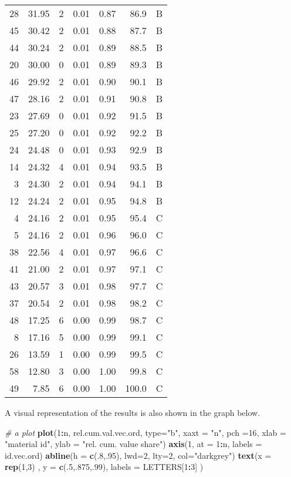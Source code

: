 \documentclass[
]{article}
\newenvironment{Shaded}{\begin{snugshade}}{\end{snugshade}}
\newcommand{\CommentTok}[1]{\textcolor[rgb]{0.56,0.35,0.01}{\textit{#1}}}
\newcommand{\DataTypeTok}[1]{\textcolor[rgb]{0.13,0.29,0.53}{#1}}
\newcommand{\DecValTok}[1]{\textcolor[rgb]{0.00,0.00,0.81}{#1}}
\newcommand{\KeywordTok}[1]{\textcolor[rgb]{0.13,0.29,0.53}{\textbf{#1}}}
\newcommand{\NormalTok}[1]{#1}
\newcommand{\OperatorTok}[1]{\textcolor[rgb]{0.81,0.36,0.00}{\textbf{#1}}}
\newcommand{\StringTok}[1]{\textcolor[rgb]{0.31,0.60,0.02}{#1}}
\begin{document}
\begin{longtable}[]{@{}rrrrrrl@{}}
28 & 31.95 & 2 & 0.01 & 0.87 & 86.9 & B\tabularnewline
45 & 30.42 & 2 & 0.01 & 0.88 & 87.7 & B\tabularnewline
44 & 30.24 & 2 & 0.01 & 0.89 & 88.5 & B\tabularnewline
20 & 30.00 & 0 & 0.01 & 0.89 & 89.3 & B\tabularnewline
46 & 29.92 & 2 & 0.01 & 0.90 & 90.1 & B\tabularnewline
47 & 28.16 & 2 & 0.01 & 0.91 & 90.8 & B\tabularnewline
23 & 27.69 & 0 & 0.01 & 0.92 & 91.5 & B\tabularnewline
25 & 27.20 & 0 & 0.01 & 0.92 & 92.2 & B\tabularnewline
24 & 24.48 & 0 & 0.01 & 0.93 & 92.9 & B\tabularnewline
14 & 24.32 & 4 & 0.01 & 0.94 & 93.5 & B\tabularnewline
3 & 24.30 & 2 & 0.01 & 0.94 & 94.1 & B\tabularnewline
12 & 24.24 & 2 & 0.01 & 0.95 & 94.8 & B\tabularnewline
4 & 24.16 & 2 & 0.01 & 0.95 & 95.4 & C\tabularnewline
5 & 24.16 & 2 & 0.01 & 0.96 & 96.0 & C\tabularnewline
38 & 22.56 & 4 & 0.01 & 0.97 & 96.6 & C\tabularnewline
41 & 21.00 & 2 & 0.01 & 0.97 & 97.1 & C\tabularnewline
43 & 20.57 & 3 & 0.01 & 0.98 & 97.7 & C\tabularnewline
37 & 20.54 & 2 & 0.01 & 0.98 & 98.2 & C\tabularnewline
48 & 17.25 & 6 & 0.00 & 0.99 & 98.7 & C\tabularnewline
8 & 17.16 & 5 & 0.00 & 0.99 & 99.1 & C\tabularnewline
26 & 13.59 & 1 & 0.00 & 0.99 & 99.5 & C\tabularnewline
58 & 12.80 & 3 & 0.00 & 1.00 & 99.8 & C\tabularnewline
49 & 7.85 & 6 & 0.00 & 1.00 & 100.0 & C\tabularnewline
\bottomrule
\end{longtable}

A visual representation of the results is also shown in the graph below.

\begin{Shaded}
\begin{Highlighting}[]
\CommentTok{# a plot}
\KeywordTok{plot}\NormalTok{(}\DecValTok{1}\OperatorTok{:}\NormalTok{n, rel.cum.val.vec.ord, }\DataTypeTok{type=}\StringTok{"b"}\NormalTok{, }\DataTypeTok{xaxt =} \StringTok{"n"}\NormalTok{, }\DataTypeTok{pch =}\DecValTok{16}\NormalTok{, }\DataTypeTok{xlab =} \StringTok{"material id"}\NormalTok{, }\DataTypeTok{ylab =} \StringTok{"rel. cum. value share"}\NormalTok{)}
\KeywordTok{axis}\NormalTok{(}\DecValTok{1}\NormalTok{, }\DataTypeTok{at =} \DecValTok{1}\OperatorTok{:}\NormalTok{n, }\DataTypeTok{labels =}\NormalTok{ id.vec.ord)}
\KeywordTok{abline}\NormalTok{(}\DataTypeTok{h =} \KeywordTok{c}\NormalTok{(.}\DecValTok{8}\NormalTok{,.}\DecValTok{95}\NormalTok{), }\DataTypeTok{lwd=}\DecValTok{2}\NormalTok{, }\DataTypeTok{lty=}\DecValTok{2}\NormalTok{, }\DataTypeTok{col=}\StringTok{"darkgrey"}\NormalTok{)}
\KeywordTok{text}\NormalTok{(}\DataTypeTok{x =} \KeywordTok{rep}\NormalTok{(}\DecValTok{1}\NormalTok{,}\DecValTok{3}\NormalTok{) , }\DataTypeTok{y =} \KeywordTok{c}\NormalTok{(.}\DecValTok{5}\NormalTok{,.}\DecValTok{875}\NormalTok{,.}\DecValTok{99}\NormalTok{), }\DataTypeTok{labels =}\NormalTok{ LETTERS[}\DecValTok{1}\OperatorTok{:}\DecValTok{3}\NormalTok{] )}
\end{Highlighting}
\end{Shaded}
\end{document}
